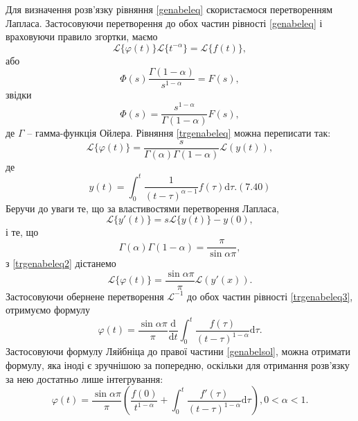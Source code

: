 \documentclass[14pt,twoside]{extreport}
\theoremstyle{mystyle}
\numberwithin{equation}{chapter}
\begin{document}
Для визначення розв'язку рівняння \eqref{genabeleq} скористаємося перетворенням Лапласа. Застосовуючи перетворення до обох частин рівності \eqref{genabeleq} і враховуючи правило згортки, маємо
\begin{equation*}
	\mathcal{L}\{\varphi(t)\}\mathcal{L}\{t^{-\alpha}\}=\mathcal{L}\{f(t)\},
\end{equation*}
або
\begin{equation}
	\Phi(s)\displaystyle \frac{\Gamma(1-\alpha)}{s^{1-\alpha}} = F(s),
\end{equation}
звідки
\begin{equation}\label{trgenabeleq}
	\Phi(s)=\displaystyle \frac{s^{1-\alpha}}{\Gamma(1-\alpha)}F(s),
\end{equation}
де $\Gamma$ -- гамма-функція Ойлера. Рівняння \eqref{trgenabeleq} можна переписати так:
\begin{equation}\label{trgenabeleq2}
	\displaystyle \mathcal{L}\{\varphi(t)\}=\frac{s}{\Gamma(\alpha)\Gamma(1-\alpha)}\mathcal{L}(y(t)),
\end{equation}
де
\begin{equation}
	y(t)=\displaystyle \int_{0}^{t}\frac{1}{(t-\tau)^{\alpha-1}}f(\tau)\mathrm{d}\tau.   (7.40)
\end{equation}
Беручи до уваги те, що за властивостями перетворення Лапласа,
\begin{equation}
	\mathcal{L}\{y'(t)\}=s\mathcal{L}\{y(t)\}-y(0),
\end{equation}
і те, що
\begin{equation*}
	\displaystyle \Gamma(\alpha)\Gamma(1-\alpha)=\frac{\pi}{\sin\alpha\pi},
\end{equation*}
з \eqref{trgenabeleq2} дістанемо
\begin{equation}\label{trgenabeleq3}
	\displaystyle \mathcal{L}\{\varphi(t)\}=\frac{\sin\alpha\pi}{\pi}\mathcal{L}(y'(x)).
\end{equation}
Застосовуючи обернене перетворення $\mathcal{L}^{-1}$ до обох частин рівності \eqref{trgenabeleq3}, отримуємо формулу
\begin{equation}\label{genabelsol}
	\varphi(t)=\displaystyle \frac{\sin\alpha\pi}{\pi}\frac{\mathrm{d}}{\mathrm{d}t}\int_{0}^{t}\frac{f(\tau)}{(t-\tau)^{1-\alpha}}\mathrm{d}\tau.
\end{equation}
Застосовуючи формулу Ляйбніца до правої частини \eqref{genabelsol}, можна отримати формулу, яка іноді є зручнішою за попередню, оскільки для отримання розв'язку за нею достатньо лише інтегрування:
\begin{equation}
	\varphi(t)=\displaystyle \frac{\sin\alpha\pi}{\pi}\left(\frac{f(0)}{t^{1-\alpha}}+\int_{0}^{t}\frac{f'(\tau)}{(t-\tau)^{1-\alpha}}\mathrm{d}\tau\right), 0<\alpha<1.
\end{equation}
\end{document}
